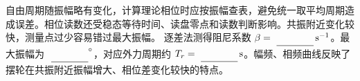 自由周期随振幅略有变化，计算理论相位时应按振幅查表，避免统一取平均周期造成误差。相位读数还受稳态等待时间、读盘零点和读数判断影响。共振附近变化较快，测量点过少容易错过最大振幅。
逐差法测得阻尼系数 $\beta=\MathField{damping_beta_s_inv}\,\mathrm{s^{-1}}$。最大振幅为 $\MathField{peak_amplitude_deg}^{\circ}$，对应外力周期约 $T_r=\MathField{resonance_period_s}\,\mathrm{s}$。幅频、相频曲线反映了摆轮在共振附近振幅增大、相位差变化较快的特点。

\ifreportimages\ReportRecord\fi

